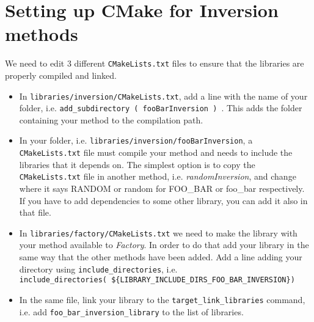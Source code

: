 \documentclass{article}
\begin{document}
\section{Setting up CMake for Inversion methods}
We need to edit 3 different \texttt{CMakeLists.txt} files to ensure that the libraries are properly compiled and linked.
\begin{itemize}
    \item In \texttt{libraries/inversion/CMakeLists.txt}, add a line with the name of your folder, i.e. \texttt{add\_subdirectory ( fooBarInversion ) }. This adds the folder containing your method to the compilation path.
    \item In your folder, i.e. \texttt{libraries/inversion/fooBarInversion}, a \texttt{CMakeLists.txt} file must compile your method and needs to include the libraries that it depends on. The simplest option is to copy the \texttt{CMakeLists.txt} file in another method, i.e. \textit{randomInversion}, and change where it says RANDOM or random for FOO\_BAR or foo\_bar respectively. If you have to add dependencies to some other library, you can add it also in that file.
    \item In \texttt{libraries/factory/CMakeLists.txt} we need to make the library with your method available to \textit{Factory}. In order to do that add your library in the same way that the other methods have been added. Add a line adding your directory using \texttt{include\_directories}, i.e.\\\texttt{include\_directories( \$\{LIBRARY\_INCLUDE\_DIRS\_FOO\_BAR\_INVERSION\})}
    \item In the same file, link your library to the \texttt{target\_link\_libraries} command, i.e. add \texttt{foo\_bar\_inversion\_library} to the list of libraries.
\end{itemize}
\end{document}
